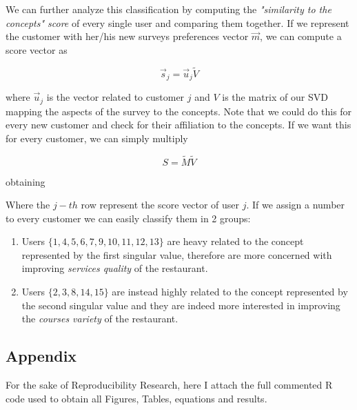 \documentclass[10pt]{article}
\theoremstyle{plain}
\theoremstyle{definition}
\begin{document}
We can further analyze this classification by computing the  \textit{"similarity to the concepts" score} of every single user and comparing them together.
If we represent the customer with her/his new surveys preferences vector $\Vec{m}$, we can compute a score vector as

\begin{equation}
\Vec{s}_j = \Vec{u}_j\tilde{V}
\end{equation}

where $\Vec{u}_j$ is the vector related to customer $j$ and $V$ is the matrix of our SVD mapping the aspects of the survey to the concepts. Note that we could do this for every new customer and check for their affiliation to the concepts. 
If we want this for every customer, we can simply multiply

\begin{equation}
S = \tilde{M}\tilde{V}
\end{equation}

obtaining



Where the $j-th$ row represent the score vector of user $j$.
\newpage
If we assign a number to every customer we can easily classify them in 2 groups:
\begin{enumerate}
	\item Users $\{1,4,5,6,7,9,10,11,12,13\}$ are heavy related to the concept represented by the first singular value, therefore are more concerned with improving \textit{services quality} of the restaurant.
	\item Users $\{2,3,8,14,15\}$ are instead highly related to the concept represented by the second singular value 	and they are indeed more interested in improving the \textit{courses variety} of the restaurant.
\end{enumerate}
\newpage
\subsection{Appendix}
For the sake of Reproducibility Research, here I attach the full commented R code used to obtain all Figures, Tables, equations and results.
\\

\end{document}
